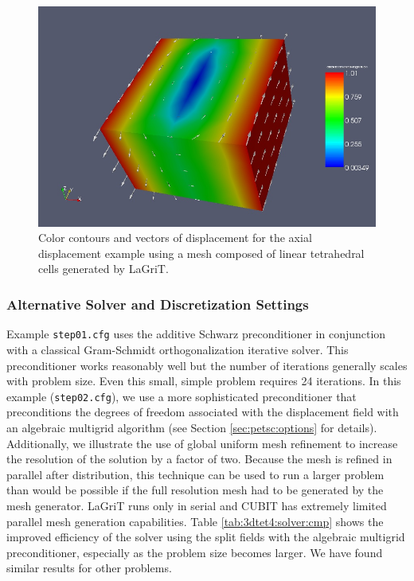 \begin{center}
\begin{figure}
\begin{centering}
\includegraphics[scale=0.45]{tutorials/3dtet4/figs/shear}
\par\end{centering}

\caption{Color contours and vectors of displacement for the axial displacement
example using a mesh composed of linear tetrahedral cells generated
by LaGriT.\label{fig:3dtet4-shear}}
\end{figure}

\par\end{center}


\subsubsection{Alternative Solver and Discretization Settings}

Example \texttt{step01.cfg} uses the additive Schwarz preconditioner
in conjunction with a classical Gram-Schmidt orthogonalization iterative
solver. This preconditioner works reasonably well but the number of
iterations generally scales with problem size. Even this small, simple
problem requires 24 iterations. In this example (\texttt{step02.cfg}),
we use a more sophisticated preconditioner that preconditions the
degrees of freedom associated with the displacement field with an
algebraic multigrid algorithm (see Section \ref{sec:petsc:options}
for details). Additionally, we illustrate the use of global uniform
mesh refinement to increase the resolution of the solution by a factor
of two. Because the mesh is refined in parallel after distribution,
this technique can be used to run a larger problem than would be possible
if the full resolution mesh had to be generated by the mesh generator.
LaGriT runs only in serial and CUBIT has extremely limited parallel
mesh generation capabilities. Table \ref{tab:3dtet4:solver:cmp} shows
the improved efficiency of the solver using the split fields with
the algebraic multigrid preconditioner, especially as the problem
size becomes larger. We have found similar results for other problems.

